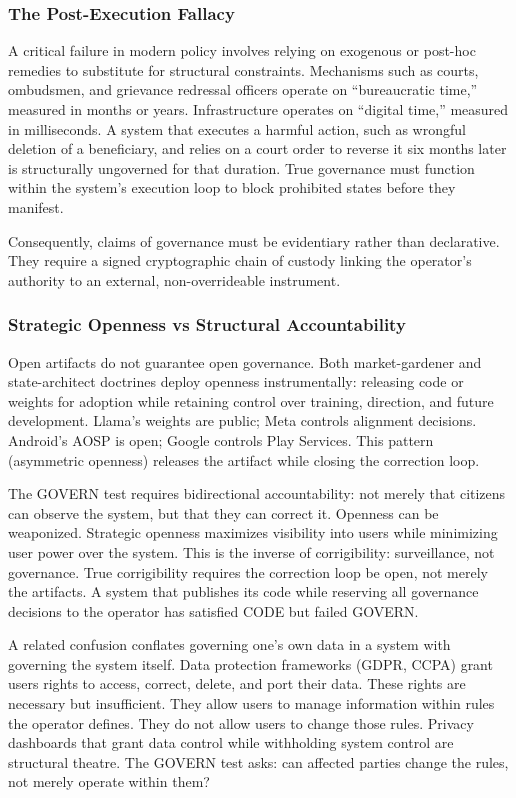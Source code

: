 \documentclass{article}
\begin{document}
\subsubsection{The Post-Execution Fallacy}
A critical failure in modern policy involves relying on exogenous or post-hoc remedies to substitute for structural constraints. Mechanisms such as courts, ombudsmen, and grievance redressal officers operate on ``bureaucratic time,'' measured in months or years. Infrastructure operates on ``digital time,'' measured in milliseconds. A system that executes a harmful action, such as wrongful deletion of a beneficiary, and relies on a court order to reverse it six months later is structurally ungoverned for that duration. True governance must function within the system's execution loop to block prohibited states before they manifest.

Consequently, claims of governance must be evidentiary rather than declarative. They require a signed cryptographic chain of custody linking the operator's authority to an external, non-overrideable instrument.

\subsubsection{Strategic Openness vs Structural Accountability}

Open artifacts do not guarantee open governance. Both market-gardener and state-architect doctrines deploy openness instrumentally: releasing code or weights for adoption while retaining control over training, direction, and future development. Llama's weights are public; Meta controls alignment decisions. Android's AOSP is open; Google controls Play Services. This pattern (asymmetric openness) releases the artifact while closing the correction loop.

The GOVERN test requires bidirectional accountability: not merely that citizens can observe the system, but that they can correct it. Openness can be weaponized. Strategic openness maximizes visibility into users while minimizing user power over the system. This is the inverse of corrigibility: surveillance, not governance. True corrigibility requires the correction loop be open, not merely the artifacts. A system that publishes its code while reserving all governance decisions to the operator has satisfied CODE but failed GOVERN.

A related confusion conflates governing one's own data in a system with governing the system itself. Data protection frameworks (GDPR, CCPA) grant users rights to access, correct, delete, and port their data. These rights are necessary but insufficient. They allow users to manage information within rules the operator defines. They do not allow users to change those rules. Privacy dashboards that grant data control while withholding system control are structural theatre. The GOVERN test asks: can affected parties change the rules, not merely operate within them?
\end{document}
